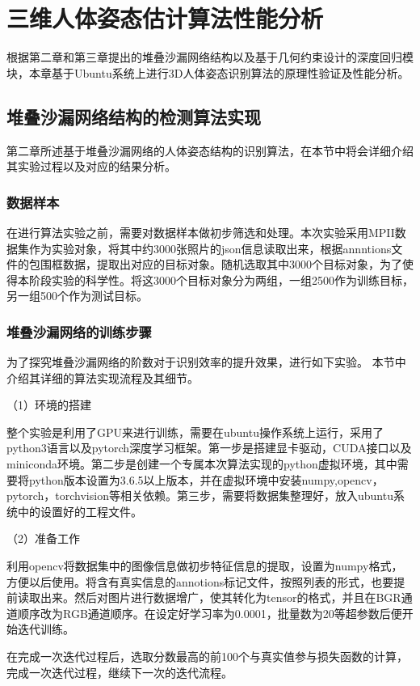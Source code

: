 \chapter{三维人体姿态估计算法性能分析}

根据第二章和第三章提出的堆叠沙漏网络结构以及基于几何约束设计的深度回归模块，本章基于Ubuntu系统上进行3D人体姿态识别算法的原理性验证及性能分析。

\section{堆叠沙漏网络结构的检测算法实现}
第二章所述基于堆叠沙漏网络的人体姿态结构的识别算法，在本节中将会详细介绍其实验过程以及对应的结果分析。

\subsection{数据样本}

在进行算法实验之前，需要对数据样本做初步筛选和处理。本次实验采用MPII数据集作为实验对象，将其中约3000张照片的json信息读取出来，根据annntions文件的包围框数据，提取出对应的目标对象。随机选取其中3000个目标对象，为了使得本阶段实验的科学性。将这3000个目标对象分为两组，一组2500作为训练目标，另一组500个作为测试目标。

\subsection{堆叠沙漏网络的训练步骤}

为了探究堆叠沙漏网络的阶数对于识别效率的提升效果，进行如下实验。
本节中介绍其详细的算法实现流程及其细节。

（1）环境的搭建

整个实验是利用了GPU来进行训练，需要在ubuntu操作系统上运行，采用了python3语言以及pytorch深度学习框架。第一步是搭建显卡驱动，CUDA接口以及miniconda环境。第二步是创建一个专属本次算法实现的python虚拟环境，其中需要将python版本设置为3.6.5以上版本，并在虚拟环境中安装numpy,opencv，pytorch，torchvision等相关依赖。第三步，需要将数据集整理好，放入ubuntu系统中的设置好的工程文件。

（2）准备工作

利用opencv将数据集中的图像信息做初步特征信息的提取，设置为numpy格式，方便以后使用。将含有真实信息的annotions标记文件，按照列表的形式，也要提前读取出来。然后对图片进行数据增广，使其转化为tensor的格式，并且在BGR通道顺序改为RGB通道顺序。在设定好学习率为0.0001，批量数为20等超参数后便开始迭代训练。

在完成一次迭代过程后，选取分数最高的前100个与真实值参与损失函数的计算，完成一次迭代过程，继续下一次的迭代流程。

